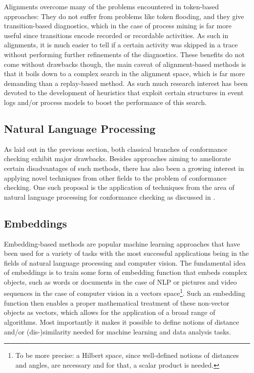 \documentclass[runningheads]{template/llncs}
\begin{document}
Alignments overcome many of the problems encountered in token-based approaches: 
They do not suffer from problems like token flooding, and they give transition-based diagnostics, which in the case of process mining is far more useful since transitions encode recorded or recordable activities. 
As such in alignments, it is much easier to tell if a certain activity was skipped in a trace without performing further refinements of the diagnostics.
These benefits do not come without drawbacks though, the main caveat of alignment-based methods is that it boils down to a complex search in the alignment space, which is far more demanding than a replay-based method.
As such much research interest has been devoted to the development of heuristics that exploit certain  structures in event logs and/or process models to boost the performance of this search.

\subsection{Natural Language Processing}
\label{sub:nlp}
As laid out in the previous section, both classical branches of conformance checking exhibit major drawbacks.
Besides approaches aiming to ameliorate certain disadvantages of such methods, there has also been a growing interest in applying novel techniques from other fields to the problem of conformance checking.
One such proposal is the application of techniques from the area of natural language processing for conformance checking as discussed in \cite{PBWe20}.

\subsection{Embeddings}
Embedding-based methods are popular machine learning approaches that have been used for a variety of tasks with the most successful applications being in the fields of natural language processing and computer vision.
The fundamental idea of embeddings is to train some form of embedding function that embeds complex objects, such as words or documents in the case of NLP or pictures and video sequences in the case of computer vision in a vectors space\footnote{To be more precise: a Hilbert space, since well-defined notions of distances and angles, are necessary and for that, a scalar product  is needed.}.
Such an embedding function then enables a proper mathematical treatment of these non-vector objects as vectors, which allows for the application of a broad range of algorithms.
Most importantly it makes it possible to define notions of distance and/or (dis-)similarity needed for machine learning and data analysis tasks.
\end{document}
